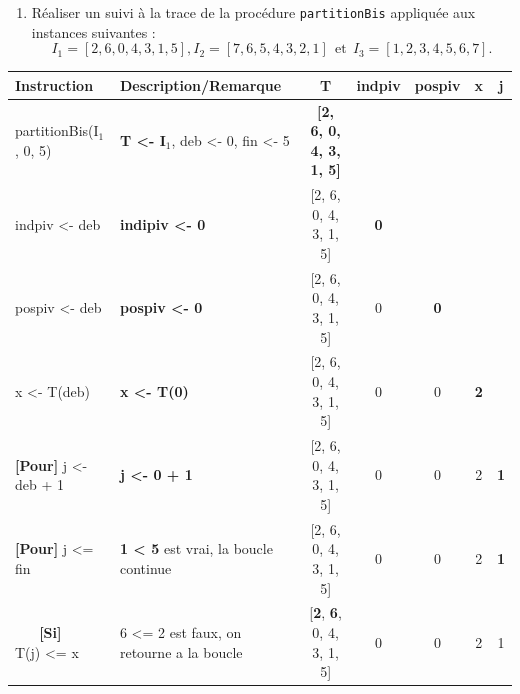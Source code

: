 \documentclass[10pt]{article} %
\newcommand{\asgold}[1]{\textcolor{mygold}{{\bf#1}}}
\newcommand{\asgr}[1]{\textcolor{mygreen}{{\bf#1}}}
\newcommand{\aspurp}[1]{\textcolor{mypurp}{{\bf#1}}}
\begin{document}
\begin{enumerate}
    \item Réaliser un suivi à la trace de la procédure \texttt{partitionBis} appliquée aux instances suivantes :
    \begin{equation*}
        I_1 = [2,6,0,4,3,1,5], I_2 = [7,6,5,4,3,2,1]\ \ \mathrm{ et }\ \ I_3 = [1,2,3,4,5,6,7].
    \end{equation*}
\end{enumerate}



\begin{table}[h!]
    \begin{tabular}{ll|ccccc}
    \hline
    Instruction                    & Description/Remarque                                          & T                         & indpiv & pospiv & x & j \\
    \hline
    partitionBis(I$_1$, 0, 5)      & \asgold{T \textless{}- I$_1$},  deb \textless{}- 0, fin \textless{}- 5 & \asgold{{[}2, 6, 0, 4, 3, 1, 5{]}} &        &        &   &   \\
    indpiv \textless{}- deb        &       \asgold{indipiv \textless{}- 0}                                                       & {[}2, 6, 0, 4, 3, 1, 5{]} & \asgold{0}      &        &   &   \\
    pospiv \textless{}- deb      &           \asgold{pospiv \textless{}- 0}                                                    & {[}2, 6, 0, 4, 3, 1, 5{]} & 0      & \asgold{0}      &   &   \\
    x \textless{}- T(deb)            &        \asgold{x \textless{}- T(0)}                                                       & {[}2, 6, 0, 4, 3, 1, 5{]} & 0      & 0      & \asgold{2} &   \\
    \asgr{[Pour]} j \textless{}- deb + 1  & \asgold{j \textless{}- 0 + 1}                                                              & {[}2, 6, 0, 4, 3, 1, 5{]} & 0      & 0      & 2 & \asgold{1} \\
    \asgr{[Pour]} j \textless{}= fin      & \aspurp{1 \textless{} 5} est vrai, la boucle continue                    & {[}2, 6, 0, 4, 3, 1, 5{]} & 0      & 0      & 2 & \aspurp{1} \\
    \asgr{\ \ \ [Si]\ \ } T(j) \textless{}= x       & \cellcolor{mypurp} 6 \textless{}= 2 est faux, on retourne a la boucle            & {[}\aspurp{2}, \aspurp{6}, 0, 4, 3, 1, 5{]} & 0      & 0      & 2 & 1 \\

\end{tabular}
\end{table}
\end{document}
